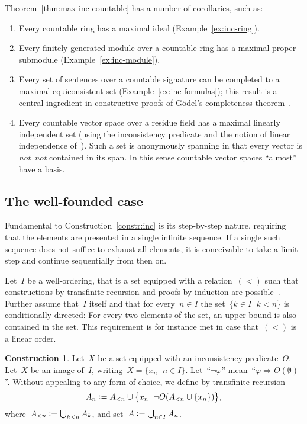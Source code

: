 \documentclass[com,11pt,crcready]{iosart2x}
\theoremstyle{definition}
\newtheorem{construction}{Construction}[section]
\theoremstyle{plain}
\theoremstyle{remark}
\newcommand{\?}{\,{:}\,}
\newcommand{\defeq}{\vcentcolon=}
\renewcommand{\_}{\mathpunct{.}\,}
\begin{document}
Theorem~\ref{thm:max-inc-countable} has a number of corollaries, such as:
\begin{enumerate}
\item[(1)] Every countable ring has a maximal ideal (Example~\ref{ex:inc-ring}).
\item[(2)] Every finitely generated module
over a countable ring has a maximal proper submodule
(Example~\ref{ex:inc-module}).
\item[(3)] Every set of sentences over a countable signature can be completed to a
maximal equiconsistent set (Example~\ref{ex:inc-formulas});
this result is a central ingredient in constructive proofs of
Gödel's completeness theorem~\cite{krivine:completeness,herbelin-ilik:henkin,forster-kirst-wehr:completeness}.
\item[(4)] Every countable vector space over a residue field has a maximal linearly
independent set (using the inconsistency predicate and the notion of linear
independence of~\cite[Section~6]{wessel-schuster:radical}). Such a set is
anonymously spanning in that every vector is \emph{not~not} contained in its
span. In this sense countable vector spaces ``almost'' have a basis.
\end{enumerate}


\subsection{The well-founded case}

Fundamental to Construction~\ref{constr:inc} is its step-by-step nature,
requiring that the elements are presented in a single infinite sequence.
If a single such sequence does not
suffice to exhaust all elements, it is conceivable to take a limit step and continue
sequentially from then on.

Let~$I$ be a well-ordering, that is a set equipped with a relation~$({<})$ such
that constructions by transfinite recursion and proofs by induction are
possible~\cite{XXX}. Further assume that~$I$ itself and that for every~$n \in
I$ the set~$\{ k \in I \,|\, k < n \}$ is conditionally directed: For every two
elements of the set, an upper bound is also contained in the set. This
requirement is for instance met in case that~$({<})$ is a linear order.

\begin{construction}\label{constr:inc-wf}Let~$X$ be a set equipped with
an inconsistency predicate~$O$. Let~$X$ be an image of~$I$, writing~$X = \{ x_n
\,|\, n \in I \}$. Let~``$\neg\varphi$'' mean~``$\varphi \Rightarrow
O(\emptyset)$''. Without appealing to any form of choice, we define by
transfinite recursion
\[ A_n \defeq A_{<n} \cup \bigl\{ x_n \,|\, \neg O(A_{<n}\cup\{x_n\}) \bigr\}, \]
where~$A_{<n} \defeq \bigcup_{k < n} A_k$, and set~$A \defeq \bigcup_{n \in I} A_n$.
\end{construction}
\end{document}
